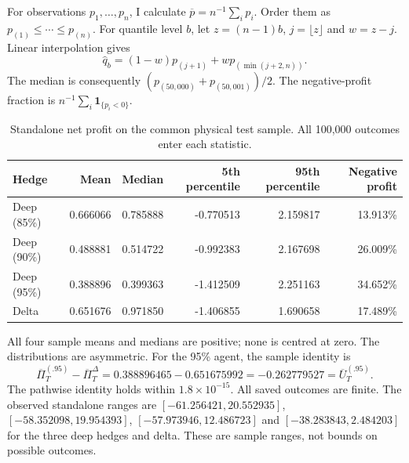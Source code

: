\documentclass[11pt,a4paper]{article}
\theoremstyle{remark}
\begin{document}
For observations $p_1,\ldots,p_n$, I calculate $\overline p=n^{-1}\sum_i p_i$. Order them as $p_{(1)}\leq\cdots\leq p_{(n)}$. For quantile level $b$, let $z=(n-1)b$, $j=\lfloor z\rfloor$ and $w=z-j$. Linear interpolation gives
\[
 \widehat q_b=(1-w)p_{(j+1)}+wp_{(\min(j+2,n))}.
\]
The median is consequently $(p_{(50,000)}+p_{(50,001)})/2$. The negative-profit fraction is $n^{-1}\sum_i\mathbf1_{\{p_i<0\}}$.

\begin{table}[htbp]
\centering\small
\caption{Standalone net profit on the common physical test sample. All 100,000 outcomes enter each statistic.}
\begin{tabular}{@{}lrrrrr@{}}
\toprule
Hedge & Mean & Median & 5th percentile & 95th percentile & Negative profit\\
\midrule
Deep (85\%) & 0.666066 & 0.785888 & -0.770513 & 2.159817 & 13.913\% \\
Deep (90\%) & 0.488881 & 0.514722 & -0.992383 & 2.167698 & 26.009\% \\
Deep (95\%) & 0.388896 & 0.399363 & -1.412509 & 2.251163 & 34.652\% \\
Delta & 0.651676 & 0.971850 & -1.406855 & 1.690658 & 17.489\% \\
\bottomrule
\end{tabular}
\end{table}

All four sample means and medians are positive; none is centred at zero. The distributions are asymmetric. For the 95\% agent, the sample identity is
\[
 \overline\Pi_T^{(.95)}-\overline\Pi_T^\Delta
 =0.388896465-0.651675992=-0.262779527
 =\overline U_T^{(.95)}.
\]
The pathwise identity holds within $1.8\times10^{-15}$. All saved outcomes are finite. The observed standalone ranges are $[-61.256421,20.552935]$, $[-58.352098,19.954393]$, $[-57.973946,12.486723]$ and $[-38.283843,2.484203]$ for the three deep hedges and delta. These are sample ranges, not bounds on possible outcomes.
\end{document}
